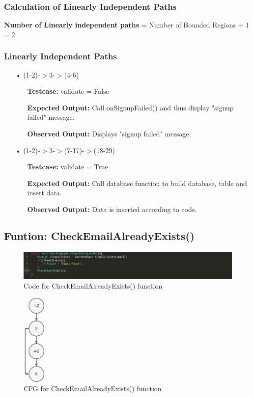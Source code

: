 \documentclass{scrreprt}
\begin{document}
\subsubsection{Calculation of Linearly Independent Paths}
\textbf{Number of Linearly independent paths} = Number of Bounded Regions + 1 = 2
\subsubsection{Linearly Independent Paths}
\begin{enumerate}

\item[•](1-2)-$>$3-$>$(4-6)
\begin{itemize}
\item[]\textbf{Testcase: } validate = False
\item[]\textbf{Expected Output: } Call onSignupFailed() and thus display "signup failed" message.
\item[]\textbf{Observed Output: } Displays "signup failed" message.
\end{itemize}

\item[•](1-2)-$>$3-$>$(7-17)-$>$(18-29)
\begin{itemize}
\item[]\textbf{Testcase: }validate = True
\item[]\textbf{Expected Output: }Call database function to build database, table and insert data.
\item[]\textbf{Observed Output: }Data is inserted according to code.
\end{itemize}

\end{enumerate}

\subsection{Funtion: CheckEmailAlreadyExists()}
\begin{figure}[H]
\centering
\includegraphics[width=\textwidth, keepaspectratio]{checkEmailAlreadyExistsCode.png}
\caption{Code for CheckEmailAlreadyExists() function}
\end{figure}

\begin{figure}[H]
\centering
\includegraphics[width=0.1\textwidth, keepaspectratio]{checkEmailAlreadyExists.png}
\caption{CFG for CheckEmailAlreadyExists() function}
\end{figure}
\end{document}
